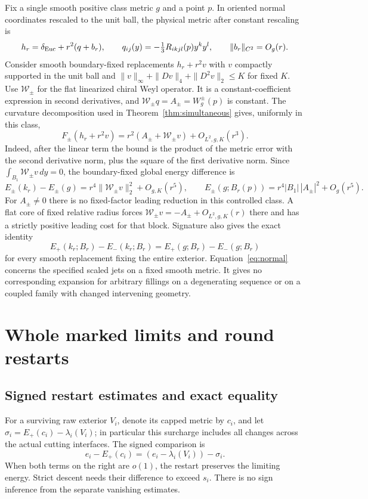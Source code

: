 \documentclass[11pt,letterpaper]{article}
\numberwithin{equation}{section}
\theoremstyle{remark}
\newcommand{\Eucl}{\delta_{\rm Euc}}
\begin{document}
Fix a single smooth positive class metric \(g\) and a point \(p\).
In oriented normal coordinates rescaled to the unit ball, the
physical metric after constant rescaling is
\[
 h_r=\Eucl+r^2(q+b_r),\qquad
 q_{ij}(y)=-\tfrac13 R_{ikjl}(p)y^ky^l,\qquad
 \|b_r\|_{C^2}=O_g(r).
\]
Consider smooth boundary-fixed replacements \(h_r+r^2v\) with
\(v\) compactly supported in the unit ball and
\(\|v\|_\infty+\|Dv\|_4+\|D^2v\|_2\le K\) for fixed \(K\).
Use \(\mathcal W_\pm\) for the flat linearized chiral Weyl
operator. It is a constant-coefficient expression in second
derivatives, and \(\mathcal W_\pm q=A_\pm=W^\pm_g(p)\)
is constant. The curvature decomposition used in
Theorem~\ref{thm:simultaneous} gives, uniformly in this class,
\[
 F_\pm(h_r+r^2v)
 =r^2(A_\pm+\mathcal W_\pm v)+O_{L^2,g,K}(r^3).
\]
Indeed, after the linear term the bound is the product of the
metric error with the second derivative norm, plus the square
of the first derivative norm. Since
\(\int_{B_1}\mathcal W_\pm v\,dy=0\), the boundary-fixed global
energy difference is
\begin{equation}\label{eq:normal}
 E_\pm(k_r)-E_\pm(g)=r^4\|\mathcal W_\pm v\|_2^2+O_{g,K}(r^5),
 \qquad
 E_\pm(g;B_r(p))=r^4|B_1|\,|A_\pm|^2+O_g(r^5).
\end{equation}
For \(A_\pm\ne0\) there is no fixed-factor leading reduction in
this controlled class. A flat core of fixed relative radius
forces \(\mathcal W_\pm v=-A_\pm+O_{L^2,g,K}(r)\) there and has a strictly
positive leading cost for that block. Signature also gives the exact
identity
\[
 E_+(k_r;B_r)-E_-(k_r;B_r)
   =E_+(g;B_r)-E_-(g;B_r)
\]
for every smooth replacement fixing the entire exterior.
Equation~\eqref{eq:normal} concerns the specified scaled jets
on a fixed smooth metric. It gives no corresponding expansion
for arbitrary fillings on a degenerating sequence or on a
coupled family with changed intervening geometry.

\section{Whole marked limits and round restarts}



\subsection{Signed restart estimates and exact equality}

For a surviving raw exterior \(V_i\), denote its capped metric
by \(c_i\), and let \(\sigma_i=E_+(c_i)-\lambda_i(V_i)\);
in particular this surcharge includes all changes across the
actual cutting interfaces. The signed comparison is
\begin{equation}\label{eq:signed-restart}
 e_i-E_+(c_i)=(e_i-\lambda_i(V_i))-\sigma_i .
\end{equation}
When both terms on the right are \(o(1)\), the restart preserves
the limiting energy. Strict descent needs their difference to
exceed \(s_i\). There is no sign inference from the separate
vanishing estimates.
\end{document}
